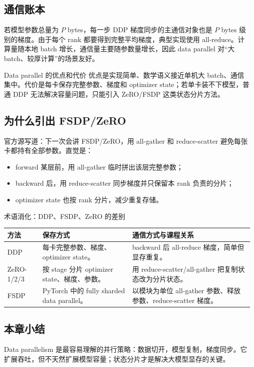 \subsection{通信账本}

若模型参数总量为 \(P\) bytes，每一步 DDP 梯度同步的主通信对象也是 \(P\) bytes 级别的梯度。由于每个 rank 都要得到完整平均梯度，典型实现使用 all-reduce。计算量随本地 batch 增长，通信量主要随参数量增长，因此 data parallel 对“大 batch、较厚计算”的场景友好。

\begin{importantbox}{Data parallel 的优点和代价}
优点是实现简单、数学语义接近单机大 batch、通信集中。代价是每卡保存完整参数、梯度和 optimizer state；若单卡装不下模型，普通 DDP 无法解决容量问题，只能引入 ZeRO/FSDP 这类状态分片方法。
\end{importantbox}

\subsection{为什么引出 FSDP/ZeRO}

官方源写道：下一次会讲 FSDP/ZeRO，用 all-gather 和 reduce-scatter 避免每张卡都持有全部参数。直觉是：

\begin{itemize}
    \item forward 某层前，用 all-gather 临时拼出该层完整参数；
    \item backward 后，用 reduce-scatter 同步梯度并只保留本 rank 负责的分片；
    \item optimizer state 也按 rank 分片，减少重复存储。
\end{itemize}

\begin{knowledgebox}{术语消化：DDP、FSDP、ZeRO 的差别}
\begin{tabular}{L{0.18\textwidth}L{0.32\textwidth}L{0.4\textwidth}}
\toprule
方法 & 保存方式 & 通信方式与课程关系 \\
\midrule
DDP & 每卡完整参数、梯度、optimizer state。 & backward 后 all-reduce 梯度，简单但显存重复。 \\
ZeRO-1/2/3 & 按 stage 分片 optimizer state、梯度、参数。 & 用 reduce-scatter/all-gather 把复制状态改为分片状态。 \\
FSDP & PyTorch 中的 fully sharded data parallel。 & 以模块为单位 all-gather 参数、释放参数、reduce-scatter 梯度。 \\
\bottomrule
\end{tabular}
\end{knowledgebox}

\subsection{本章小结}

Data parallelism 是最容易理解的并行策略：数据切开，模型复制，梯度同步。它扩展吞吐，但不天然扩展模型容量；状态分片才是解决大模型显存的关键。

